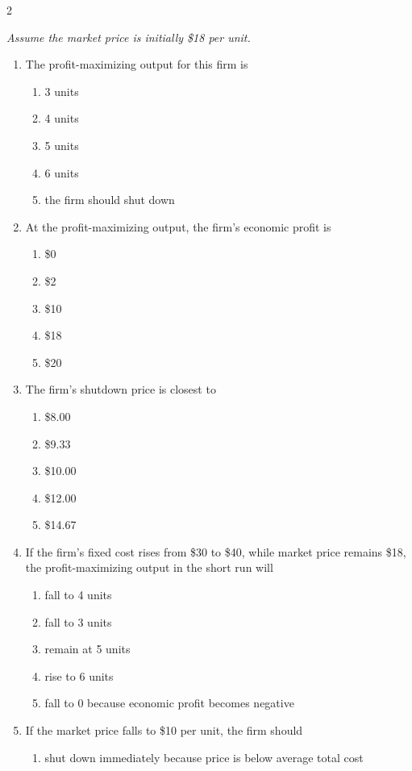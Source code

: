 \documentclass[10pt]{article}
\newenvironment{choiceslist}
  {\begin{enumerate}[label=(\Alph*), leftmargin=1.6em, itemsep=0.12em, topsep=0.18em, parsep=0pt]}
  {\end{enumerate}}
\newenvironment{stimulus}
  {\begin{center}\begin{minipage}{0.96\columnwidth}\footnotesize\itshape\setlength{\tabcolsep}{3pt}\renewcommand{\arraystretch}{0.96}}
  {\end{minipage}\end{center}}
\begin{document}
\begin{multicols*}{2}
\begin{stimulus}
Assume the market price is initially \$18 per unit.
\end{stimulus}
\begin{enumerate}[resume*=apq, leftmargin=*, itemsep=0.85em, topsep=0.2em, parsep=0pt]
\item The profit-maximizing output for this firm is
\begin{choiceslist}
\item 3 units
\item 4 units
\item 5 units
\item 6 units
\item the firm should shut down
\end{choiceslist}
\item At the profit-maximizing output, the firm's economic profit is
\begin{choiceslist}
\item \$0
\item \$2
\item \$10
\item \$18
\item \$20
\end{choiceslist}
\item The firm's shutdown price is closest to
\begin{choiceslist}
\item \$8.00
\item \$9.33
\item \$10.00
\item \$12.00
\item \$14.67
\end{choiceslist}
\item If the firm's fixed cost rises from \$30 to \$40, while market price remains \$18, the profit-maximizing output in the short run will
\begin{choiceslist}
\item fall to 4 units
\item fall to 3 units
\item remain at 5 units
\item rise to 6 units
\item fall to 0 because economic profit becomes negative
\end{choiceslist}
\item If the market price falls to \$10 per unit, the firm should
\begin{choiceslist}
\item shut down immediately because price is below average total cost

\end{choiceslist}
\end{enumerate}
\end{multicols*}
\end{document}
